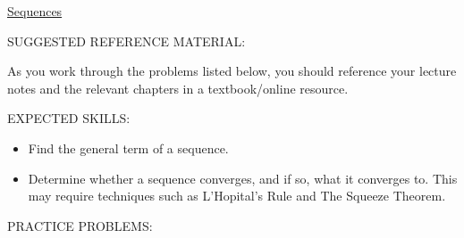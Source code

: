 \documentclass[12pt]{article}
\begin{document}
\begin{center}
\underline{\LARGE{Sequences}}
\end{center}

\noindent SUGGESTED REFERENCE MATERIAL:

\medskip

\noindent As you work through the problems listed below, you should reference your lecture notes and the relevant chapters in a textbook/online resource.

\medskip

\noindent EXPECTED SKILLS:

\medskip

\begin{itemize}[topsep=0pt]

\item Find the general term of a sequence.

\item Determine whether a sequence converges, and if so, what it converges to.  This may require techniques such as L'Hopital's Rule and The Squeeze Theorem.

\end{itemize}

\bigskip

\noindent PRACTICE PROBLEMS:

\medskip

\end{document}
